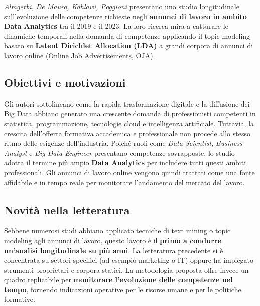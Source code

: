 \textit{Almgerbi, De Mauro, Kahlawi, Poggioni} presentano uno studio longitudinale sull'evoluzione delle competenze richieste negli \textbf{annunci di lavoro in ambito Data Analytics} tra il 2019 e il 2023. 
La loro ricerca mira a catturare le dinamiche temporali nella domanda di competenze applicando il topic modeling basato su \textbf{Latent Dirichlet Allocation (LDA)} a grandi corpora di annunci di lavoro online (Online Job Advertisements, OJA).

\subsection{Obiettivi e motivazioni}
Gli autori sottolineano come la rapida trasformazione digitale e la diffusione dei Big Data abbiano generato una crescente domanda di professionisti competenti in statistica, programmazione, tecnologie cloud e intelligenza artificiale.
Tuttavia, la crescita dell'offerta formativa accademica e professionale non procede allo stesso ritmo delle esigenze dell'industria.
Poiché ruoli come \textit{Data Scientist}, \textit{Business Analyst} e \textit{Big Data Engineer} presentano competenze sovrapposte, lo studio adotta il termine più ampio \textbf{Data Analytics} per includere tutti questi ambiti professionali.
Gli annunci di lavoro online vengono quindi trattati come una fonte affidabile e in tempo reale per monitorare l'andamento del mercato del lavoro.

\subsection{Novità nella letteratura}
Sebbene numerosi studi abbiano applicato tecniche di text mining o topic modeling agli annunci di lavoro, questo lavoro è il \textbf{primo a condurre un'analisi longitudinale su più anni}.
La letteratura precedente si è concentrata su settori specifici (ad esempio marketing o IT) oppure ha impiegato strumenti proprietari e corpora statici.
La metodologia proposta offre invece un quadro replicabile per \textbf{monitorare l'evoluzione delle competenze nel tempo}, fornendo indicazioni operative per le risorse umane e per le politiche formative.

